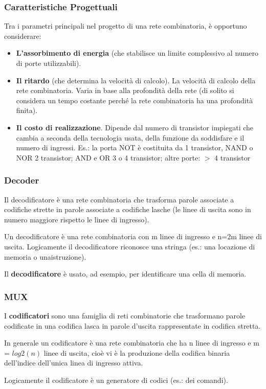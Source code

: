 \documentclass[12pt]{article}
\begin{document}
\subsubsection{Caratteristiche Progettuali}
Tra i parametri principali nel progetto di una rete combinatoria, è opportuno considerare:
\begin{itemize}
    \item \textbf{L’assorbimento di energia} (che stabilisce un limite complessivo al numero di porte utilizzabili).
    \item \textbf{Il ritardo} (che determina la velocità di calcolo). La velocità di calcolo della rete combinatoria. Varia in base alla profondità della rete (di solito si considera un tempo costante perché la rete combinatoria ha una profondità finita).
    \item \textbf{Il costo di realizzazione}. Dipende dal numero di transistor impiegati che cambia a seconda della tecnologia usata, della funzione da soddisfare e il numero di ingressi. Es.: la porta NOT è costituita da 1 transistor, NAND o NOR 2 transistor; AND e OR 3 o 4 transistor; altre porte: \(>\) 4 transistor\par\medskip\noindent
\end{itemize}
\subsubsection{Decoder}
Il decodificatore è una rete combinatoria che trasforma parole associate a codifiche strette in parole associate a codifiche lasche (le linee di uscita sono in numero maggiore rispetto le linee di ingresso).\par\medskip\noindent
Un decodificatore è una rete combinatoria con m linee di ingresso e n=2m linee di uscita. Logicamente il decodificatore riconosce una stringa (es.: una locazione di memoria o unaistruzione).\par\medskip\noindent
Il \textbf{decodificatore} è usato, ad esempio, per identificare una cella di memoria.\par\medskip\noindent

\subsubsection{MUX}
I \textbf{codificatori} sono una famiglia di reti combinatorie che trasformano parole codificate in una codifica lasca in parole d’uscita rappresentate in codifica stretta. \par\medskip\noindent
In generale un codificatore è una rete combinatoria che ha n linee di ingresso e m = \(log2(n) \) linee di uscita, cioè vi è la produzione della codifica binaria dell’indice dell’unica linea di ingresso attiva. \par\medskip\noindent
Logicamente il codificatore è un generatore di codici (es.: dei comandi).
\end{document}
